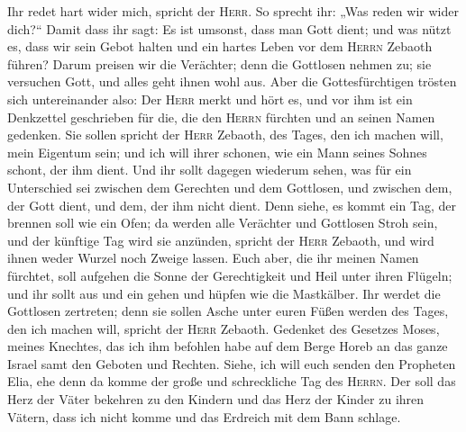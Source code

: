 Ihr redet hart wider mich, spricht der \textsc{Herr}. So
sprecht ihr: „Was reden wir wider dich?{}``  Damit dass
ihr sagt: Es ist umsonst, dass man Gott dient; und was nützt es, dass
wir sein Gebot halten und ein hartes Leben vor dem \textsc{Herrn}
Zebaoth führen?  Darum preisen wir die Verächter; denn
die Gottlosen nehmen zu; sie versuchen Gott, und alles geht ihnen wohl
aus.  Aber die Gottesfürchtigen trösten sich
untereinander also: Der \textsc{Herr} merkt und hört es, und vor ihm ist
ein Denkzettel geschrieben für die, die den \textsc{Herrn} fürchten und
an seinen Namen gedenken.  Sie sollen spricht der
\textsc{Herr} Zebaoth, des Tages, den ich machen will, mein Eigentum
sein; und ich will ihrer schonen, wie ein Mann seines Sohnes schont, der
ihm dient.  Und ihr sollt dagegen wiederum sehen, was für
ein Unterschied sei zwischen dem Gerechten und dem Gottlosen, und
zwischen dem, der Gott dient, und dem, der ihm nicht dient.
 Denn siehe, es kommt ein Tag, der brennen soll wie ein
Ofen; da werden alle Verächter und Gottlosen Stroh sein, und der
künftige Tag wird sie anzünden, spricht der \textsc{Herr} Zebaoth, und
wird ihnen weder Wurzel noch Zweige lassen.  Euch aber,
die ihr meinen Namen fürchtet, soll aufgehen die Sonne der Gerechtigkeit
und Heil unter ihren Flügeln; und ihr sollt aus und ein gehen und hüpfen
wie die Mastkälber.  Ihr werdet die Gottlosen zertreten;
denn sie sollen Asche unter euren Füßen werden des Tages, den ich machen
will, spricht der \textsc{Herr} Zebaoth.  Gedenket des
Gesetzes Moses, meines Knechtes, das ich ihm befohlen habe auf dem Berge
Horeb an das ganze Israel samt den Geboten und Rechten. 
Siehe, ich will euch senden den Propheten Elia, ehe denn da komme der
große und schreckliche Tag des \textsc{Herrn}.  Der soll
das Herz der Väter bekehren zu den Kindern und das Herz der Kinder zu
ihren Vätern, dass ich nicht komme und das Erdreich mit dem Bann
schlage.
